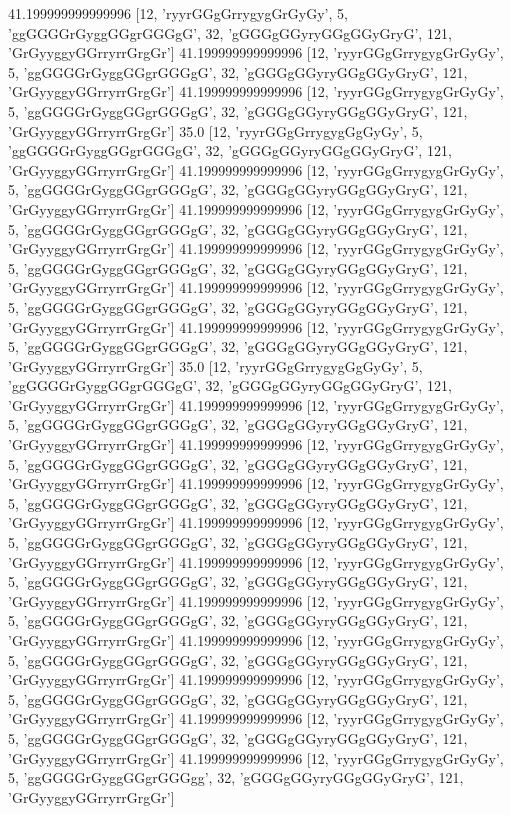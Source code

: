 41.199999999999996 [12, 'ryyrGGgGrrygygGrGyGy', 5, 'ggGGGGrGyggGGgrGGGgG', 32, 'gGGGgGGyryGGgGGyGryG', 121, 'GrGyyggyGGrryrrGrgGr']
41.199999999999996 [12, 'ryyrGGgGrrygygGrGyGy', 5, 'ggGGGGrGyggGGgrGGGgG', 32, 'gGGGgGGyryGGgGGyGryG', 121, 'GrGyyggyGGrryrrGrgGr']
41.199999999999996 [12, 'ryyrGGgGrrygygGrGyGy', 5, 'ggGGGGrGyggGGgrGGGgG', 32, 'gGGGgGGyryGGgGGyGryG', 121, 'GrGyyggyGGrryrrGrgGr']
35.0 [12, 'ryyrGGgGrrygygGgGyGy', 5, 'ggGGGGrGyggGGgrGGGgG', 32, 'gGGGgGGyryGGgGGyGryG', 121, 'GrGyyggyGGrryrrGrgGr']
41.199999999999996 [12, 'ryyrGGgGrrygygGrGyGy', 5, 'ggGGGGrGyggGGgrGGGgG', 32, 'gGGGgGGyryGGgGGyGryG', 121, 'GrGyyggyGGrryrrGrgGr']
41.199999999999996 [12, 'ryyrGGgGrrygygGrGyGy', 5, 'ggGGGGrGyggGGgrGGGgG', 32, 'gGGGgGGyryGGgGGyGryG', 121, 'GrGyyggyGGrryrrGrgGr']
41.199999999999996 [12, 'ryyrGGgGrrygygGrGyGy', 5, 'ggGGGGrGyggGGgrGGGgG', 32, 'gGGGgGGyryGGgGGyGryG', 121, 'GrGyyggyGGrryrrGrgGr']
41.199999999999996 [12, 'ryyrGGgGrrygygGrGyGy', 5, 'ggGGGGrGyggGGgrGGGgG', 32, 'gGGGgGGyryGGgGGyGryG', 121, 'GrGyyggyGGrryrrGrgGr']
41.199999999999996 [12, 'ryyrGGgGrrygygGrGyGy', 5, 'ggGGGGrGyggGGgrGGGgG', 32, 'gGGGgGGyryGGgGGyGryG', 121, 'GrGyyggyGGrryrrGrgGr']
35.0 [12, 'ryyrGGgGrrygygGgGyGy', 5, 'ggGGGGrGyggGGgrGGGgG', 32, 'gGGGgGGyryGGgGGyGryG', 121, 'GrGyyggyGGrryrrGrgGr']
41.199999999999996 [12, 'ryyrGGgGrrygygGrGyGy', 5, 'ggGGGGrGyggGGgrGGGgG', 32, 'gGGGgGGyryGGgGGyGryG', 121, 'GrGyyggyGGrryrrGrgGr']
41.199999999999996 [12, 'ryyrGGgGrrygygGrGyGy', 5, 'ggGGGGrGyggGGgrGGGgG', 32, 'gGGGgGGyryGGgGGyGryG', 121, 'GrGyyggyGGrryrrGrgGr']
41.199999999999996 [12, 'ryyrGGgGrrygygGrGyGy', 5, 'ggGGGGrGyggGGgrGGGgG', 32, 'gGGGgGGyryGGgGGyGryG', 121, 'GrGyyggyGGrryrrGrgGr']
41.199999999999996 [12, 'ryyrGGgGrrygygGrGyGy', 5, 'ggGGGGrGyggGGgrGGGgG', 32, 'gGGGgGGyryGGgGGyGryG', 121, 'GrGyyggyGGrryrrGrgGr']
41.199999999999996 [12, 'ryyrGGgGrrygygGrGyGy', 5, 'ggGGGGrGyggGGgrGGGgG', 32, 'gGGGgGGyryGGgGGyGryG', 121, 'GrGyyggyGGrryrrGrgGr']
41.199999999999996 [12, 'ryyrGGgGrrygygGrGyGy', 5, 'ggGGGGrGyggGGgrGGGgG', 32, 'gGGGgGGyryGGgGGyGryG', 121, 'GrGyyggyGGrryrrGrgGr']
41.199999999999996 [12, 'ryyrGGgGrrygygGrGyGy', 5, 'ggGGGGrGyggGGgrGGGgG', 32, 'gGGGgGGyryGGgGGyGryG', 121, 'GrGyyggyGGrryrrGrgGr']
41.199999999999996 [12, 'ryyrGGgGrrygygGrGyGy', 5, 'ggGGGGrGyggGGgrGGGgG', 32, 'gGGGgGGyryGGgGGyGryG', 121, 'GrGyyggyGGrryrrGrgGr']
41.199999999999996 [12, 'ryyrGGgGrrygygGrGyGy', 5, 'ggGGGGrGyggGGgrGGGgG', 32, 'gGGGgGGyryGGgGGyGryG', 121, 'GrGyyggyGGrryrrGrgGr']
41.199999999999996 [12, 'ryyrGGgGrrygygGrGyGy', 5, 'ggGGGGrGyggGGgrGGGgg', 32, 'gGGGgGGyryGGgGGyGryG', 121, 'GrGyyggyGGrryrrGrgGr']
